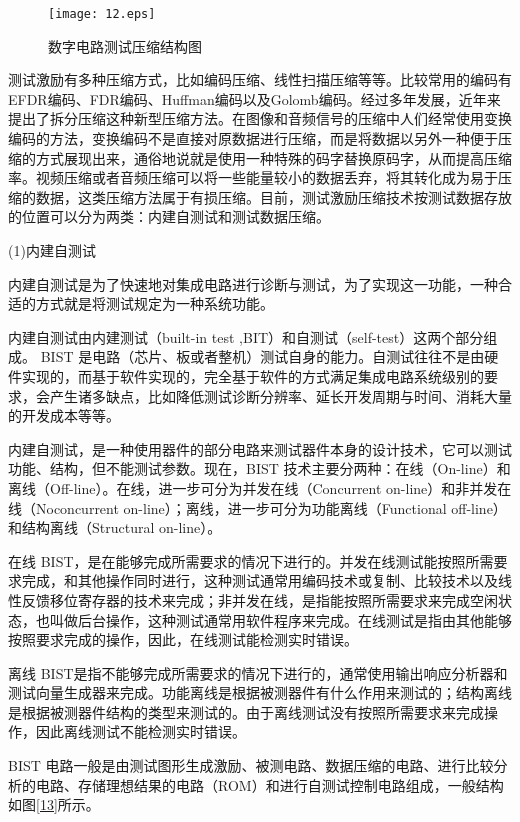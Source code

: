 \begin{figure}[H]
  \centering
  \texttt{[image: 12.eps]}
  \caption{数字电路测试压缩结构图}\label{12}
     \end{figure}

测试激励有多种压缩方式，比如编码压缩、线性扫描压缩等等。比较常用的编码有EFDR编码、FDR编码、Huffman编码以及Golomb编码。经过多年发展，近年来提出了拆分压缩这种新型压缩方法。在图像和音频信号的压缩中人们经常使用变换编码的方法，变换编码不是直接对原数据进行压缩，而是将数据以另外一种便于压缩的方式展现出来，通俗地说就是使用一种特殊的码字替换原码字，从而提高压缩率。视频压缩或者音频压缩可以将一些能量较小的数据丢弃，将其转化成为易于压缩的数据，这类压缩方法属于有损压缩。目前，测试激励压缩技术按测试数据存放的位置可以分为两类：内建自测试\cite{27,28}和测试数据压缩。

(1)内建自测试\cite{29}

内建自测试是为了快速地对集成电路进行诊断与测试，为了实现这一功能，一种合适的方式就是将测试规定为一种系统功能。

内建自测试由内建测试（built-in test ,BIT）和自测试（self-test）这两个部分组成。 BIST 是电路（芯片、板或者整机）测试自身的能力。自测试往往不是由硬件实现的，而基于软件实现的，完全基于软件的方式满足集成电路系统级别的要求，会产生诸多缺点，比如降低测试诊断分辨率、延长开发周期与时间、消耗大量的开发成本等等。

内建自测试，是一种使用器件的部分电路来测试器件本身的设计技术，它可以测试功能、结构，但不能测试参数。现在，BIST 技术主要分两种：在线（On-line）\cite{30}和离线（Off-line）。在线，进一步可分为并发在线（Concurrent on-line）和非并发在线（Noconcurrent on-line）；离线，进一步可分为功能离线（Functional off-line）和结构离线（Structural on-line）。

在线 BIST，是在能够完成所需要求的情况下进行的。并发在线测试能按照所需要求完成，和其他操作同时进行，这种测试通常用编码技术或复制、比较技术以及线性反馈移位寄存器\cite{31,32}的技术来完成；非并发在线，是指能按照所需要求来完成空闲状态，也叫做后台操作，这种测试通常用软件程序来完成。在线测试是指由其他能够按照要求完成的操作，因此，在线测试能检测实时错误。

离线 BIST\cite{33}是指不能够完成所需要求的情况下进行的，通常使用输出响应分析器和测试向量生成器来完成。功能离线是根据被测器件有什么作用来测试的；结构离线是根据被测器件结构的类型来测试的。由于离线测试没有按照所需要求来完成操作，因此离线测试不能检测实时错误\cite{34}。

BIST 电路一般是由测试图形生成激励、被测电路、数据压缩的电路、进行比较分析的电路、存储理想结果的电路（ROM）和进行自测试控制电路组成，一般结构如图\ref{13}所示。

